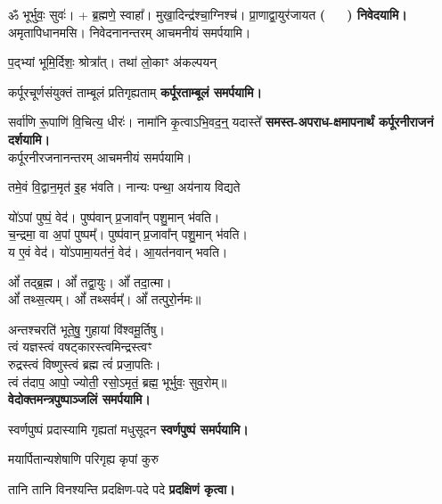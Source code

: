 \begin{center}
ॐ भूर्भुवः॒ सुवः॑। + ब्र॒ह्मणे॒ स्वाहा᳚।
{मुखा॒दिन्द्र॑श्चा॒ग्निश्च॑। प्रा॒णाद्वा॒युर॑जायत}
\textbf{\devAya{} \mbox{(~~~)} निवेदयामि।}\\
{अमृतापिधानमसि। निवेदनानन्तरम् आचमनीयं समर्पयामि।}
\medskip

{प॒द्भ्यां भूमि॒र्दिशः॒ श्रोत्रा᳚त्। तथा॑ लो॒काꣳ अ॑कल्पयन्}

{कर्पूरचूर्णसंयुक्तं ताम्बूलं प्रतिगृह्यताम्}
\textbf{\devAya{} कर्पूरताम्बूलं समर्पयामि।}
\medskip

{सर्वा॑णि रू॒पाणि॑ वि॒चित्य॒ धीरः॑। नामा॑नि कृ॒त्वाऽभि॒वद॒न्॒ यदास्ते᳚}
\textbf{\devAya{} समस्त-अपराध-क्षमापनार्थं कर्पूरनीराजनं दर्शयामि।}\\
कर्पूरनीरजनानन्तरम् आचमनीयं समर्पयामि।\medskip

{तमे॒वं वि॒द्वान॒मृत॑ इ॒ह भ॑वति। नान्यः पन्था॒ अय॑नाय विद्यते}

यो॑ऽपां पुष्पं॒ वेद॑। पुष्प॑वान् प्र॒जावा᳚न् पशु॒मान् भ॑वति।\\
च॒न्द्रमा॒ वा अ॒पां पुष्पम्᳚। पुष्प॑वान् प्र॒जावा᳚न् पशु॒मान् भ॑वति।\\
य ए॒वं वेद॑। यो॑ऽपामा॒यत॑नं॒ वेद॑। आ॒यत॑नवान् भवति।\medskip

ओं᳚ तद्ब्र॒ह्म। ओं᳚ तद्वा॒युः। ओं᳚ तदा॒त्मा।\\ ओं᳚ तथ्स॒त्यम्‌।
ओं᳚ तथ्सर्वम्᳚‌। ओं᳚ तत्पुरो॒र्नमः॥\medskip

अन्तश्चरति॑ भूते॒षु॒ गुहायां वि॑श्वमू॒र्तिषु। \\
त्वं यज्ञस्त्वं वषट्कारस्त्वमिन्द्रस्त्वꣳ\\ रुद्रस्त्वं विष्णुस्त्वं ब्रह्म त्वं॑ प्रजा॒पतिः। \\
त्वं त॑दाप॒ आपो॒ ज्योती॒ रसो॒ऽमृतं॒ ब्रह्म॒ भूर्भुवः॒ सुव॒रोम्‌॥\\
\textbf{\devAya{} वेदोक्तमन्त्रपुष्पाञ्जलिं समर्पयामि।}
\medskip

{स्वर्णपुष्पं प्रदास्यामि गृह्यतां मधुसूदन}
\textbf{\devAya{} स्वर्णपुष्पं समर्पयामि।}
\medskip
\medskip

{मयार्पितान्यशेषाणि परिगृह्य कृपां कुरु}

{तानि तानि विनश्यन्ति प्रदक्षिण-पदे पदे}
\textbf{प्रदक्षिणं कृत्वा।}
\medskip


\end{center}
